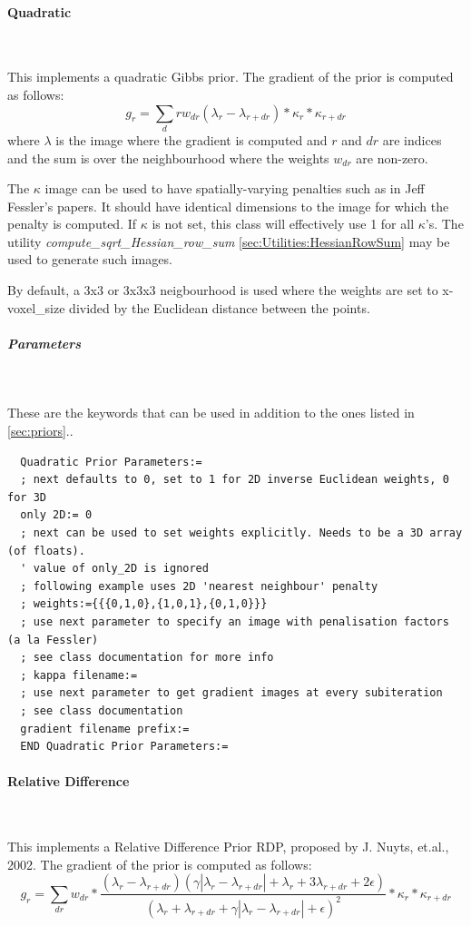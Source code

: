 \documentclass{article}
\newcommand{\subsubsubsection}[1]{\paragraph{#1}\mbox{} \\}
\newcommand{\subsubsubsubsection}[1]{\subparagraph{#1} \mbox{} \\}
\begin{document}
{{{ \subsubsubsection{Quadratic} \label{sec:priors:Quadratic}
}
This implements a quadratic Gibbs prior. The gradient of the prior is computed as follows:
 \[
  g_r = \sum_dr w_{dr} (\lambda_r - \lambda_{r+dr}) * \kappa_r * \kappa_{r+dr}
  \]
  \noindent where $\lambda$ is the image where the gradient is computed
   and $r$ and $dr$ are indices and the sum
  is over the neighbourhood where the weights $w_{dr}$ are non-zero.

  The $\kappa$ image can be used to have spatially-varying penalties such as in 
  Jeff Fessler's papers. It should have identical dimensions to the image for which the
  penalty is computed. If $\kappa$ is not set, this class will effectively
  use 1 for all $\kappa$'s.
  The utility \textit{compute\_sqrt\_Hessian\_row\_sum} \ref{sec:Utilities:HessianRowSum} may be used to generate such images.

  By default, a 3x3 or 3x3x3 neigbourhood is used where the weights are set to 
  x-voxel\_size divided by the Euclidean distance between the points.
 
{ \subsubsubsubsection{Parameters}
}
  These are the keywords that can be used in addition to the ones listed in \ref{sec:priors}..
  \begin{verbatim}
  Quadratic Prior Parameters:=
  ; next defaults to 0, set to 1 for 2D inverse Euclidean weights, 0 for 3D 
  only 2D:= 0
  ; next can be used to set weights explicitly. Needs to be a 3D array (of floats).
  ' value of only_2D is ignored
  ; following example uses 2D 'nearest neighbour' penalty
  ; weights:={{{0,1,0},{1,0,1},{0,1,0}}}
  ; use next parameter to specify an image with penalisation factors (a la Fessler)
  ; see class documentation for more info
  ; kappa filename:=
  ; use next parameter to get gradient images at every subiteration
  ; see class documentation
  gradient filename prefix:= 
  END Quadratic Prior Parameters:=
  \end{verbatim}


{ \subsubsubsection{Relative Difference} \label{sec:priors:Relative_Difference}
}
This implements a Relative Difference Prior RDP, proposed by J. Nuyts, et.al., 2002. The gradient of the prior is computed as follows:
  \[g_r = \sum_{dr} w_{dr} *
  \frac{\left(\lambda_{r}-\lambda_{r+dr}\right)\left(\gamma\left|\lambda_{r}-\lambda_{r+dr}\right|+\lambda_{r}+3 \lambda_{r+dr} + 2 \epsilon \right)}
  {\left(\lambda_{r}+\lambda_{r+dr}+\gamma\left|\lambda_{r}-\lambda_{r+dr}\right| + \epsilon \right)^{2}} *
  \kappa_r * \kappa_{r+dr}\]

}}
\end{document}
